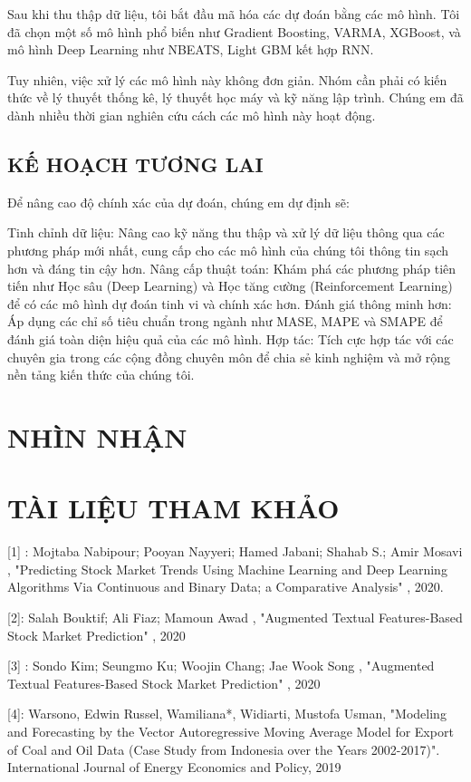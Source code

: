\documentclass{article}
\begin{document}
\begin{multicols}{2}
Sau khi thu thập dữ liệu, tôi bắt đầu mã hóa các dự đoán bằng các mô hình. Tôi đã chọn một số mô hình phổ biến như Gradient Boosting, VARMA, XGBoost, và mô hình Deep Learning như NBEATS,  Light GBM kết hợp RNN. 

Tuy nhiên, việc xử lý các mô hình này không đơn giản. Nhóm cần phải có kiến thức về lý thuyết thống kê, lý thuyết học máy và kỹ năng lập trình. Chúng em đã dành nhiều thời gian nghiên cứu cách các mô hình này hoạt động.

\subsection{KẾ HOẠCH TƯƠNG LAI }

Để nâng cao độ chính xác của dự đoán, chúng em dự định sẽ:

Tinh chỉnh dữ liệu: Nâng cao kỹ năng thu thập và xử lý dữ liệu thông qua các phương pháp mới nhất, cung cấp cho các mô hình của chúng tôi thông tin sạch hơn và đáng tin cậy hơn.
Nâng cấp thuật toán: Khám phá các phương pháp tiên tiến như Học sâu (Deep Learning) và Học tăng cường (Reinforcement Learning) để có các mô hình dự đoán tinh vi và chính xác hơn.
Đánh giá thông minh hơn: Áp dụng các chỉ số tiêu chuẩn trong ngành như MASE, MAPE và SMAPE để đánh giá toàn diện hiệu quả của các mô hình.
Hợp tác: Tích cực hợp tác với các chuyên gia trong các cộng đồng chuyên môn để chia sẻ kinh nghiệm và mở rộng nền tảng kiến thức của chúng tôi.

\section{NHÌN NHẬN  }


\section{TÀI LIỆU THAM KHẢO}


[1] : Mojtaba Nabipour; Pooyan Nayyeri; Hamed Jabani; Shahab S.; Amir Mosavi , "Predicting Stock Market Trends Using Machine Learning and Deep Learning Algorithms Via Continuous and Binary Data; a Comparative Analysis" , 2020. 

[2]: Salah Bouktif; Ali Fiaz; Mamoun Awad , "Augmented Textual Features-Based Stock Market Prediction" , 2020 

[3] : Sondo Kim; Seungmo Ku; Woojin Chang; Jae Wook Song , "Augmented Textual Features-Based Stock Market Prediction" , 2020 


[4]: Warsono, Edwin Russel, Wamiliana*, Widiarti, Mustofa Usman, "Modeling and Forecasting by the Vector Autoregressive Moving Average Model for Export of Coal and Oil Data (Case Study from Indonesia over the Years 2002-2017)". International Journal of Energy Economics and Policy, 2019


\end{multicols}
\end{document}
